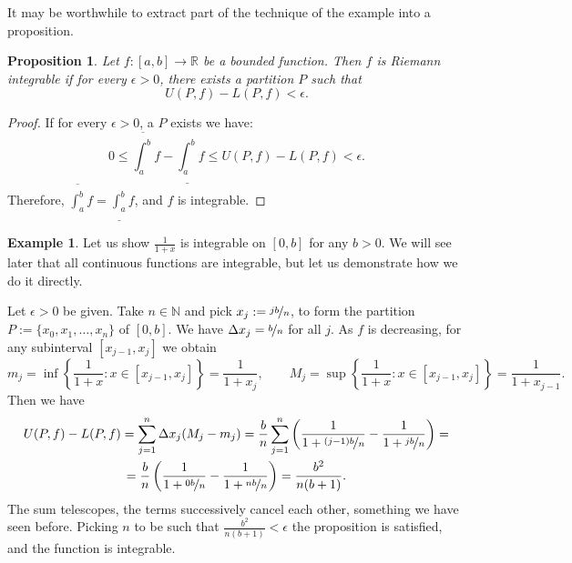 \documentclass[12pt]{book}
\newcommand{\R}{{\mathbb{R}}}
\newcommand{\N}{{\mathbb{N}}}
\theoremstyle{plain}
\newtheorem{prop}[thm]{Proposition}
\theoremstyle{remark}
\theoremstyle{definition}
\theoremstyle{exercise}
\theoremstyle{example}
\newtheorem{example}[thm]{Example}
\begin{document}
It may be worthwhile to extract part of the technique of the example into a
proposition.

\begin{prop}
Let $f \colon [a,b] \to \R$ be a bounded function.  Then $f$ is Riemann
integrable if for every $\epsilon > 0$, there exists a partition $P$ such that
\begin{equation*}
U(P,f) - L(P,f) < \epsilon .
\end{equation*}
\end{prop}

\begin{proof}
If for every $\epsilon > 0$, a $P$ exists we have:
\begin{equation*}
0 \leq
\overline{\int_a^b} f - 
\underline{\int_a^b} f
\leq
U(P,f) - L(P,f) < \epsilon .
\end{equation*}
Therefore, 
$\overline{\int_a^b} f = \underline{\int_a^b} f$, and $f$ is integrable.
\end{proof}

\begin{example}
Let us show $\frac{1}{1+x}$ is integrable on $[0,b]$ for any $b > 0$.
We will see later that all continuous functions are integrable, but let us
demonstrate how we do it directly.

Let $\epsilon > 0$ be given.  Take $n \in \N$ and
pick $x_j := \nicefrac{jb}{n}$, to form the 
partition $P := \{ x_0,x_1,\ldots,x_n \}$ of $[0,b]$.
We have $\Delta x_j = \nicefrac{b}{n}$ for all $j$.  
As $f$ is decreasing, for any subinterval $[x_{j-1},x_j]$ we obtain
\begin{equation*}
m_j = \inf \left\{ \frac{1}{1+x} : x \in [x_{j-1},x_j] \right\} = \frac{1}{1+x_j} ,
\qquad
M_j = \sup \left\{ \frac{1}{1+x} : x \in [x_{j-1},x_j] \right\} =
\frac{1}{1+x_{j-1}} .
\end{equation*}
Then we have
\begin{multline*}
U(P,f)-L(P,f)
=
\sum_{j=1}^n
\Delta x_j
(M_j-m_j)
=
\frac{b}{n}
\sum_{j=1}^n 
\left( \frac{1}{1+\nicefrac{(j-1)b}{n}} - \frac{1}{1+\nicefrac{jb}{n}} \right) 
=
\\
=
\frac{b}{n}
\left( \frac{1}{1+\nicefrac{0b}{n}} - \frac{1}{1+\nicefrac{nb}{n}} \right) 
=
\frac{b^2}{n(b+1)} .
\end{multline*}
The sum telescopes, the terms successively cancel each other, something
we have seen before.
Picking $n$ to be such that
$\frac{b^2}{n(b+1)} < \epsilon$ the proposition is satisfied, and the
function is integrable.
\end{example}
\end{document}
